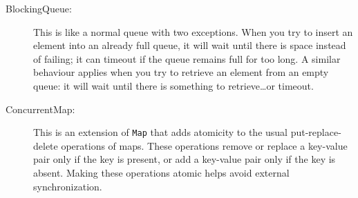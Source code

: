 \begin{description}
\item[BlockingQueue: ] This is like a normal queue with two
  exceptions. When you try to insert an element into an already full
  queue, it will wait until there is space instead of failing; it can
  timeout if the queue remains full for too long. A similar behaviour
  applies when you try to retrieve an element from an empty queue: it
  will wait until there is something to retrieve\ldots or timeout.
\item[ConcurrentMap: ] This is an extension of \verb+Map+ that adds
  atomicity to the usual put-replace-delete operations of maps. These
  operations remove or replace a key-value pair only if the key is
  present, or add a key-value pair only if the key is absent. Making
  these operations atomic helps avoid external synchronization.
\end{description}
